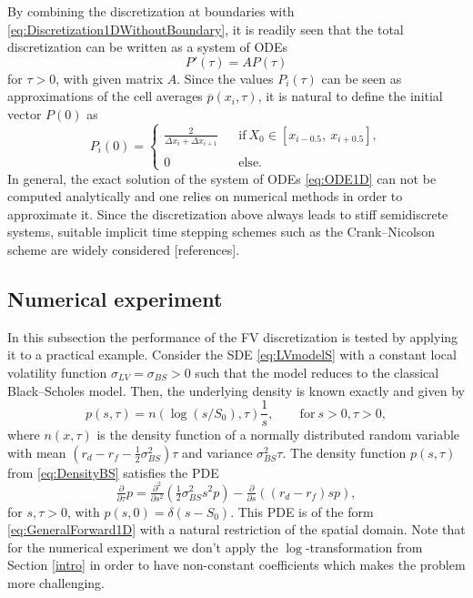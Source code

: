 \documentclass[10pt]{article}
\begin{document}
By combining the discretization at boundaries with \eqref{eq:Discretization1DWithoutBoundary}, it is readily seen that the total discretization can be written as a system of ODEs
\begin{equation}
P'(\tau) = A P(\tau)
\label{eq:ODE1D}
\end{equation} 
for $\tau > 0$, with given matrix $A$. 
Since the values $P_{i}(\tau)$ can be seen as approximations of the cell averages $\overline{p}(x_{i},\tau)$, it is natural to define the initial vector $P(0)$ as 
$$ P_{i}(0) = \left\{ \begin{array}{lll}
\tfrac{2}{\Delta x_{i} + \Delta x_{i+1}} & & \mathrm{if} \ X_{0} \in [x_{i-0.5}, \ x_{i+0.5}], \\\\
0 && \mathrm{else.}
\end{array} \right. $$
In general, the exact solution of the system of ODEs \eqref{eq:ODE1D} can not be computed analytically and one relies on numerical methods in order to approximate it. Since the discretization above always leads to stiff semidiscrete systems, suitable implicit time stepping schemes such as the Crank--Nicolson scheme are widely considered [references].

 

\subsection{Numerical experiment} \label{subsec:Experiment1D}

In this subsection the performance of the FV discretization is tested by applying it to a practical example. Consider the SDE \eqref{eq:LVmodelS} with a constant local volatility function $\sigma_{LV} = \sigma_{BS} > 0$ such that the model reduces to the classical Black--Scholes model. Then, the underlying density is known exactly and given by
\begin{equation}
p(s,\tau) = n(\log(s/S_{0}),\tau)\frac{1}{s}, \qquad \mathrm{for} \ s>0, \tau > 0,
\label{eq:DensityBS}
\end{equation}
where $n(x,\tau)$ is the density function of a normally distributed random variable with mean $(r_{d}-r_{f}-\tfrac{1}{2}\sigma_{BS}^{2})\tau$ and variance $\sigma_{BS}^{2}\tau$. The density function $p(s,\tau)$ from \eqref{eq:DensityBS} satisfies the PDE
$$ \tfrac{\partial}{\partial \tau} p = \tfrac{\partial^{2}}{\partial s^{2}} \left( \tfrac{1}{2} \sigma_{BS}^{2}s^{2}p \right) - \tfrac{\partial}{\partial s} \left( (r_{d} - r_{f})s p \right), $$
for $s, \tau > 0$, with $p(s,0)=\delta(s-S_{0})$. This PDE is of the form \eqref{eq:GeneralForward1D} with a natural restriction of the spatial domain. Note that for the numerical experiment we don't apply the $\log$-transformation from Section \ref{intro} in order to have non-constant coefficients which makes the problem more challenging.
\end{document}
